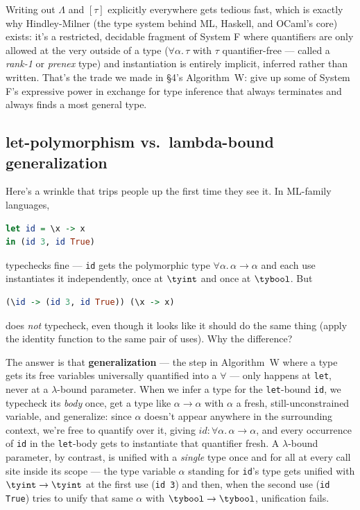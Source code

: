 Writing out $\Lambda$ and $[\tau]$ explicitly everywhere gets tedious fast, which is exactly why Hindley-Milner (the type system behind ML, Haskell, and OCaml's core) exists: it's a restricted, decidable fragment of System F where quantifiers are only allowed at the very outside of a type ($\forall \alpha.\,\tau$ with $\tau$ quantifier-free — called a \emph{rank-1} or \emph{prenex} type) and instantiation is entirely implicit, inferred rather than written. That's the trade we made in \S4's Algorithm~W: give up some of System F's expressive power in exchange for type inference that always terminates and always finds a most general type.

\subsection{let-polymorphism vs.\ lambda-bound generalization}

Here's a wrinkle that trips people up the first time they see it. In ML-family languages,
\begin{lstlisting}[language=Haskell]
let id = \x -> x
in (id 3, id True)
\end{lstlisting}
typechecks fine — \lstinline|id| gets the polymorphic type $\forall\alpha.\,\alpha\to\alpha$ and each use instantiates it independently, once at $\tyint$ and once at $\tybool$. But
\begin{lstlisting}[language=Haskell]
(\id -> (id 3, id True)) (\x -> x)
\end{lstlisting}
does \emph{not} typecheck, even though it looks like it should do the same thing (apply the identity function to the same pair of uses). Why the difference?

The answer is that \textbf{generalization} — the step in Algorithm~W where a type gets its free variables universally quantified into a $\forall$ — only happens at \lstinline|let|, never at a $\lambda$-bound parameter. When we infer a type for the \lstinline|let|-bound \lstinline|id|, we typecheck its \emph{body} once, get a type like $\alpha \to \alpha$ with $\alpha$ a fresh, still-unconstrained variable, and generalize: since $\alpha$ doesn't appear anywhere in the surrounding context, we're free to quantify over it, giving $\mathit{id} : \forall \alpha.\,\alpha\to\alpha$, and every occurrence of \lstinline|id| in the \lstinline|let|-body gets to instantiate that quantifier fresh. A $\lambda$-bound parameter, by contrast, is unified with a \emph{single} type once and for all at every call site inside its scope — the type variable $\alpha$ standing for \lstinline|id|'s type gets unified with $\tyint\to\tyint$ at the first use (\lstinline|id 3|) and then, when the second use (\lstinline|id True|) tries to unify that same $\alpha$ with $\tybool\to\tybool$, unification fails.

